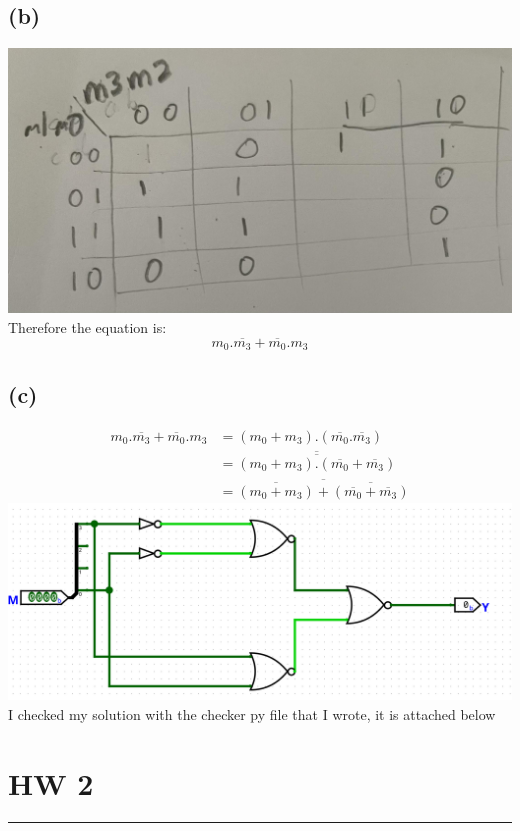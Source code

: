 \documentclass[12pt]{article}
\begin{document}
\subsection*{(b)}
\includegraphics[scale=0.15]{Problem7Kmap.jpg}\\
Therefore the equation is:
$$\boxed{m_0.\overline{m_3}+\overline{m_0}.m_3}$$
\subsection*{(c)}
\begin{align*}
   m_0.\overline{m_3}+\overline{m_0}.m_3&=(m_0+m_3).(\overline{m_0}.\overline{m_3})\\
   &=\overline{\overline{(m_0+m_3).(\overline{m_0}+\overline{m_3})}}\\
   &=\overline{\overline{(m_0+m_3)}+\overline{(\overline{m_0}+\overline{m_3})}}
\end{align*}
\includegraphics[scale=0.25]{Problem7Partc.png}\\
I checked my solution with the checker py file that I wrote, it  is attached below
\section*{HW 2}
\noindent\rule{15cm}{1pt}
\end{document}
